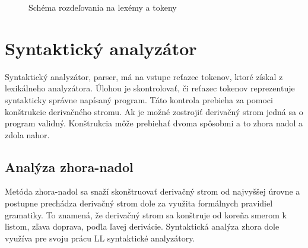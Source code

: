 \begin{center}
\begin{figure}
\caption{Schéma rozdeľovania na lexémy a tokeny}
\label{fig:lex}

\end{figure}
\end{center}


\section{Syntaktický analyzátor}
Syntaktický analyzátor, parser, má na vstupe reťazec tokenov, ktoré získal
z lexikálneho analyzátora. Úlohou je skontrolovať, či
reťazec tokenov reprezentuje syntakticky správne napísaný program. Táto kontrola
prebieha za pomoci konštrukcie derivačného stromu. Ak je možné zostrojiť derivačný strom
jedná sa o program validný. Konštrukcia môže prebiehať dvoma spôsobmi a to zhora
nadol a zdola nahor. \cite{meduna} 

\subsection{Analýza zhora-nadol}
Metóda zhora-nadol sa snaží skonštruovať derivačný strom od najvyššej úrovne a postupne prechádza derivačný strom dole za využita formálnych pravidiel gramatiky. To znamená, že derivačný strom sa konštruje od koreňa smerom k listom, zľava doprava, poďla ľavej derivácie. Syntaktická analýza zhora dole využíva pre svoju prácu LL syntaktické analyzátory. \cite{aho}

